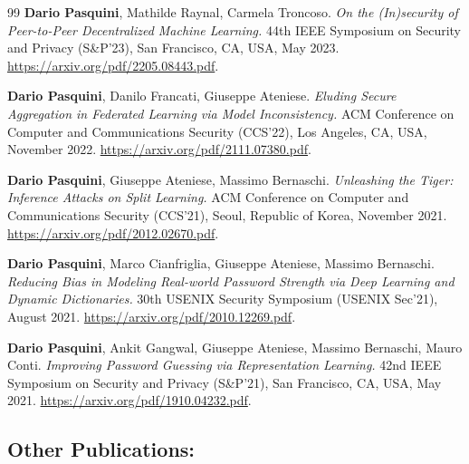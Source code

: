 \documentclass[10pt]{article} %
\begin{document}
\begin{thebibliography}{99}
\textbf{Dario Pasquini}, Mathilde Raynal, Carmela Troncoso. \textit{On the (In)security of Peer-to-Peer Decentralized Machine Learning.} 44th IEEE Symposium on Security and Privacy (S\&P'23), San Francisco, CA, USA, May 2023. \url{https://arxiv.org/pdf/2205.08443.pdf}. 

\textbf{Dario Pasquini}, Danilo Francati, Giuseppe Ateniese. \textit{Eluding Secure Aggregation in Federated Learning via Model Inconsistency.} ACM Conference on Computer and Communications Security (CCS'22), Los Angeles, CA, USA, November 2022. \url{https://arxiv.org/pdf/2111.07380.pdf}. 

\textbf{Dario Pasquini}, Giuseppe Ateniese, Massimo Bernaschi. \textit{Unleashing the Tiger: Inference Attacks on Split Learning.} ACM Conference on Computer and Communications Security (CCS'21), Seoul, Republic of Korea, November 2021. \url{https://arxiv.org/pdf/2012.02670.pdf}. 

\textbf{Dario Pasquini}, Marco Cianfriglia, Giuseppe Ateniese, Massimo Bernaschi. \textit{Reducing Bias in Modeling Real-world Password Strength via Deep Learning and Dynamic Dictionaries.} 30th USENIX Security Symposium (USENIX Sec'21), August 2021. \url{https://arxiv.org/pdf/2010.12269.pdf}. 
	
 \textbf{Dario Pasquini}, Ankit Gangwal, Giuseppe Ateniese, Massimo Bernaschi, Mauro Conti. \textit{Improving Password Guessing via Representation Learning.} 42nd IEEE Symposium on Security and Privacy (S\&P'21), San Francisco, CA, USA, May 2021. \url{https://arxiv.org/pdf/1910.04232.pdf}. 

\end{thebibliography}




	
\subsection*{Other Publications:}
\vspace{.5cm}
\end{document}
